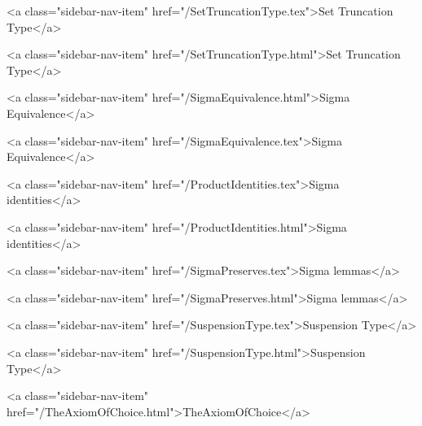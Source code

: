       
        
          <a class="sidebar-nav-item" href="/SetTruncationType.tex">Set Truncation Type</a>
        
      
    
      
        
          <a class="sidebar-nav-item" href="/SetTruncationType.html">Set Truncation Type</a>
        
      
    
      
        
          <a class="sidebar-nav-item" href="/SigmaEquivalence.html">Sigma Equivalence</a>
        
      
    
      
        
          <a class="sidebar-nav-item" href="/SigmaEquivalence.tex">Sigma Equivalence</a>
        
      
    
      
        
          <a class="sidebar-nav-item" href="/ProductIdentities.tex">Sigma identities</a>
        
      
    
      
        
          <a class="sidebar-nav-item" href="/ProductIdentities.html">Sigma identities</a>
        
      
    
      
        
          <a class="sidebar-nav-item" href="/SigmaPreserves.tex">Sigma lemmas</a>
        
      
    
      
        
          <a class="sidebar-nav-item" href="/SigmaPreserves.html">Sigma lemmas</a>
        
      
    
      
        
          <a class="sidebar-nav-item" href="/SuspensionType.tex">Suspension Type</a>
        
      
    
      
        
          <a class="sidebar-nav-item" href="/SuspensionType.html">Suspension Type</a>
        
      
    
      
        
          <a class="sidebar-nav-item" href="/TheAxiomOfChoice.html">TheAxiomOfChoice</a>
        

